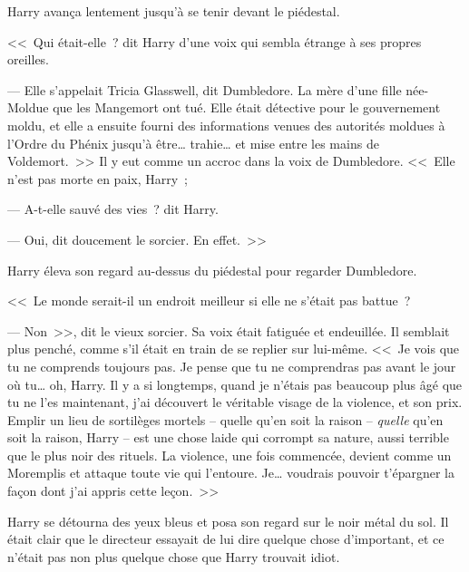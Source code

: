Harry avança lentement jusqu'à se tenir devant le piédestal.

<<~Qui était-elle~? dit Harry d'une voix qui sembla étrange à ses propres oreilles.

--- Elle s'appelait Tricia Glasswell, dit Dumbledore. La mère d'une fille née-Moldue que les Mangemort ont tué. Elle était détective pour le gouvernement moldu, et elle a ensuite fourni des informations venues des autorités moldues à l'Ordre du Phénix jusqu'à être… trahie… et mise entre les mains de Voldemort.~>> Il y eut comme un accroc dans la voix de Dumbledore. <<~Elle n'est pas morte en paix, Harry~;

--- A-t-elle sauvé des vies~? dit Harry.

--- Oui, dit doucement le sorcier. En effet.~>>

Harry éleva son regard au-dessus du piédestal pour regarder Dumbledore.

<<~Le monde serait-il un endroit meilleur si elle ne s'était pas battue~?

--- Non~>>, dit le vieux sorcier. Sa voix était fatiguée et endeuillée. Il semblait plus penché, comme s'il était en train de se replier sur lui-même. <<~Je vois que tu ne comprends toujours pas. Je pense que tu ne comprendras pas avant le jour où tu… oh, Harry. Il y a si longtemps, quand je n'étais pas beaucoup plus âgé que tu ne l'es maintenant, j'ai découvert le véritable visage de la violence, et son prix. Emplir un lieu de sortilèges mortels -- quelle qu'en soit la raison -- \emph{quelle} qu'en soit la raison, Harry -- est une chose laide qui corrompt sa nature, aussi terrible que le plus noir des rituels. La violence, une fois commencée, devient comme un Moremplis et attaque toute vie qui l'entoure. Je… voudrais pouvoir t'épargner la façon dont j'ai appris cette leçon.~>>

Harry se détourna des yeux bleus et posa son regard sur le noir métal du sol. Il était clair que le directeur essayait de lui dire quelque chose d'important, et ce n'était pas non plus quelque chose que Harry trouvait idiot.

